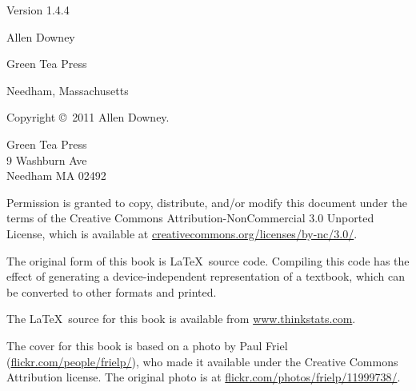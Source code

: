 \documentclass[12pt]{book}
\newcommand{\theversion}{1.4.4}
\begin{document}
\begin{latexonly}
\begin{flushright}
\vspace{0.25in}

Version \theversion

\vspace{1in}


{\Large
Allen Downey\\
}


\vspace{0.5in}

{\Large Green Tea Press}

{\small Needham, Massachusetts}

\vfill

\end{flushright}


\pagebreak
\thispagestyle{empty}

{\small
Copyright \copyright ~2011 Allen Downey.


\vspace{0.2in}

\begin{flushleft}
Green Tea Press       \\
9 Washburn Ave \\
Needham MA 02492
\end{flushleft}

Permission is granted to copy, distribute, and/or modify this document
under the terms of the Creative Commons Attribution-NonCommercial 3.0 Unported
License, which is available at \url{creativecommons.org/licenses/by-nc/3.0/}.

The original form of this book is \LaTeX\ source code.  Compiling this
code has the effect of generating a device-independent representation
of a textbook, which can be converted to other formats and printed.

The \LaTeX\ source for this book is available from
\url{www.thinkstats.com}.

The cover for this book is based on a photo by Paul Friel
(\url{flickr.com/people/frielp/}), who made it available under
the Creative Commons Attribution license.  The original photo
is at \url{flickr.com/photos/frielp/11999738/}.

\vspace{0.2in}

} %

\end{latexonly}


\end{document}

